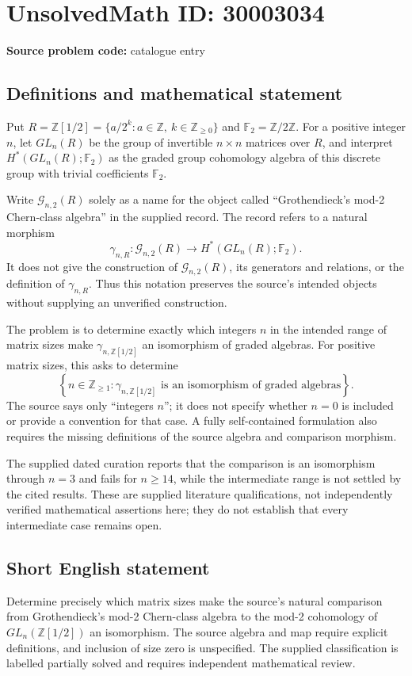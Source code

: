 \documentclass[11pt]{article}
\newcommand{\Z}{\mathbb{Z}}
\newcommand{\F}{\mathbb{F}}
\begin{document}
\section*{UnsolvedMath ID: 30003034}
\textbf{Source problem code:} catalogue entry
\subsection{Definitions and mathematical statement}
Put \(R=\Z[1/2]=\{a/2^k:a\in\Z,\ k\in\Z_{\geq 0}\}\) and \(\F_2=\Z/2\Z\). For a positive integer \(n\), let \(GL_n(R)\) be the group of invertible \(n\times n\) matrices over \(R\), and interpret \(H^*(GL_n(R);\F_2)\) as the graded group cohomology algebra of this discrete group with trivial coefficients \(\F_2\).

Write \(\mathcal G_{n,2}(R)\) solely as a name for the object called ``Grothendieck's mod-2 Chern-class algebra'' in the supplied record. The record refers to a natural morphism
\[
\gamma_{n,R}:\mathcal G_{n,2}(R)\longrightarrow H^*(GL_n(R);\F_2).
\]
It does not give the construction of \(\mathcal G_{n,2}(R)\), its generators and relations, or the definition of \(\gamma_{n,R}\). Thus this notation preserves the source's intended objects without supplying an unverified construction.

The problem is to determine exactly which integers \(n\) in the intended range of matrix sizes make \(\gamma_{n,\Z[1/2]}\) an isomorphism of graded algebras. For positive matrix sizes, this asks to determine
\[
\left\{n\in\Z_{\geq 1}:\gamma_{n,\Z[1/2]}\text{ is an isomorphism of graded algebras}\right\}.
\]
The source says only ``integers \(n\)''; it does not specify whether \(n=0\) is included or provide a convention for that case. A fully self-contained formulation also requires the missing definitions of the source algebra and comparison morphism.

The supplied dated curation reports that the comparison is an isomorphism through \(n=3\) and fails for \(n\geq 14\), while the intermediate range is not settled by the cited results. These are supplied literature qualifications, not independently verified mathematical assertions here; they do not establish that every intermediate case remains open.
\subsection{Short English statement}
Determine precisely which matrix sizes make the source's natural comparison from Grothendieck's mod-2 Chern-class algebra to the mod-2 cohomology of \(GL_n(\Z[1/2])\) an isomorphism. The source algebra and map require explicit definitions, and inclusion of size zero is unspecified. The supplied classification is labelled partially solved and requires independent mathematical review.
\end{document}

